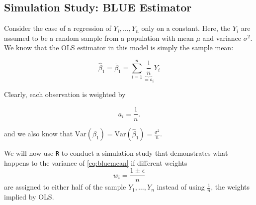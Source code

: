 \documentclass[]{book}
\theoremstyle{definition}
\theoremstyle{definition}
\theoremstyle{definition}
\theoremstyle{remark}
\begin{document}
\subsection*{Simulation Study: BLUE
Estimator}\label{simulation-study-blue-estimator}

Consider the case of a regression of \(Y_i,\dots,Y_n\) only on a
constant. Here, the \(Y_i\) are assumed to be a random sample from a
population with mean \(\mu\) and variance \(\sigma^2\). We know that the
OLS estimator in this model is simply the sample mean:

\begin{equation}
\hat{\beta}_1 = \overline{\beta}_1 = \sum_{i=1}^n \underbrace{\frac{1}{n}}_{=a_i} Y_i \label{eq:bluemean}
\end{equation}

Clearly, each observation is weighted by

\[a_i = \frac{1}{n}.\]

and we also know that
\(\text{Var}(\hat{\beta}_1)=\text{Var}(\hat\beta_1)=\frac{\sigma^2}{n}\).

We will now use \texttt{R} to conduct a simulation study that
demonstrates what happens to the variance of \eqref{eq:bluemean} if
different weights \[ w_i = \frac{1 \pm \epsilon}{n} \] are assigned to
either half of the sample \(Y_1, \dots, Y_n\) instead of using
\(\frac{1}{n}\), the weights implied by OLS.
\end{document}
